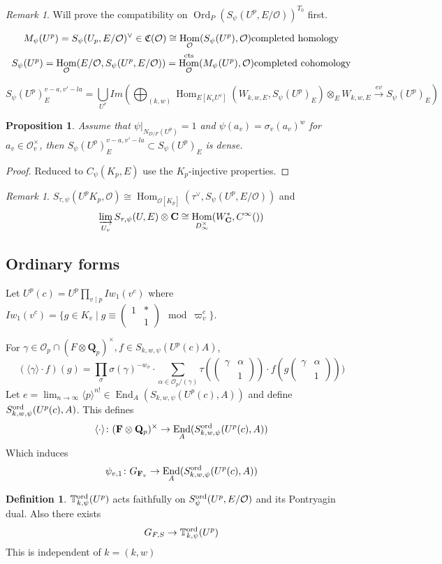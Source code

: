 \documentclass[leqno]{amsart}
\newcommand{\smat}[1]{\left( \begin{smallmatrix} #1 \end{smallmatrix} \right)}
\DeclareMathOperator{\Ord}{Ord}
\newcommand{\cts}{\textnormal{cts}}
\newcommand{\ord}{\textnormal{ord}}
\newcommand{\Qp}{\mathbf{Q}_p}
\newcommand{\C}{\mathbf C}
\newcommand{\F}{{\mathbf{F}}} %
\newcommand{\oo}{\mathcal O}
\newcommand{\1}{\mathbf{1}}
\newcommand{\fC}{\mathfrak C}
\DeclareMathOperator{\End}{End}
\DeclareMathOperator{\Hom}{Hom}
\newtheorem{prop}[thm]{Proposition}
\theoremstyle{definition}
\newtheorem{defn}[thm]{Definition}
\theoremstyle{remark}
\newtheorem{rem}[thm]{Remark}
\begin{document}
\begin{rem}
	Will prove the compatibility on 
	$\Ord_P(S_\psi(U^p,E/\oo))^{T_0}$ first.
\end{rem}



\begin{gather*}
	M_\psi(U^p)=S_\psi(U_p,E/\oo)^{\vee}\in \fC(\oo)
	\cong \Hom_\oo(S_\psi(U^p),\oo)\text{completed homology}\\
	S_\psi(U^p)=\Hom_{\oo}(E/\oo, S_\psi(U^p,E/\oo))=
	\Hom_{\oo}^{\cts}(M_\psi(U^p), \oo) \text{completed cohomology}
\end{gather*}


\[
S_\psi(U^p)_E^{v-a,v'-la}=
\bigcup_{U^v}
Im\left(
	\bigoplus_{(k,w)}\Hom_{E[K_vU^v]}(W_{k,w,E}, S_\psi(U^p)_E)
	\otimes_EW_{k,w,E}\xrightarrow{ev}
	S_\psi(U^p)_E
\right)
\]
\begin{prop}
Assume that $\psi\vert_{N_{D/F}(U^p)}=1$ and 
$\psi(a_v)=\sigma_v(a_v)^w$
for  $a_v\in \oo_v^\times$,
then $S_\psi(U^p)_E^{v-a,v'-la}\subset S_\psi(U^p)_E$
is dense.
\end{prop}
\begin{proof}
	Reduced to $C_\psi(K_p,E)$ use the  $K_p$-injective properties.
\end{proof}



\begin{rem}
	$S_{\tau,\psi}(U^pK_p,\oo)
	\cong \Hom_{\oo[K_p]}(\tau^\vee, S_\psi(U^p,E/\oo))$
	and 
	\[
		\varinjlim_{U_v}
		S_{\tau,\psi}(U,E)\otimes \C
		\cong \Hom_{D_\infty^\times}
		(W_\C^*, C^\infty())
	\]
\end{rem}

\subsection{Ordinary forms}

Let $U^p(c)=U^p\prod_{v\mid p}Iw_1(v^c)$
where $Iw_1(v^c)=\{g\in K_v\mid g\equiv \smat{1&*\\&1}\mod \varpi_v^c\}$.

For $\gamma\in \oo_p\cap (F\otimes\Qp)^\times, f\in S_{k,w,\psi}(U^p(c) A)$,
\[
	(\langle\gamma\rangle\cdot f)(g)=
	\prod_{\sigma}\sigma(\gamma)^{-w_\sigma}\cdot
	\sum_{\alpha\in \oo_p/(\gamma)}
	\tau(\smat{\gamma&\alpha\\&1})\cdot
	f(g\smat{\gamma&\alpha\\&1}))
\]
Let $e=\lim_{n\to \infty}\langle p\rangle^{n!}\in \End_A(S_{k,w,\psi}(U^p(c),A))$
and define $S_{k,w,\psi}^{\ord}(U^p(c),A)$. This defines
\[
	\langle\cdot\rangle\colon (\F\otimes\Qp)^\times
	\to \End_A(S_{k,w,\psi}^{\ord}(U^p(c),A))
\]
Which induces  
\[
	\psi_{v,1}\colon G_{\F_v}
	\to \End_A(S_{k,w,\psi}^{\ord}(U^p(c),A))
\]
\begin{defn}
	$\mathbb{T}_{k, \psi}^{\ord}(U^p)$ 
	acts faithfully on 
	$S_\psi^{\ord}(U^p,E/\oo)$ 
	and its Pontryagin dual.
	Also there exists 
	\[
		G_{F,S}\to \mathbb{T}_{k, \psi}^{\ord}(U^p)
	\]
	This is independent of $k=(k,w)$
\end{defn}
\end{document}
